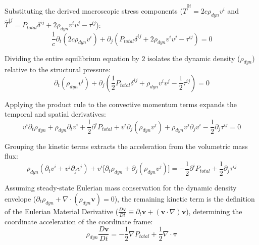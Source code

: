 Substituting the derived macroscopic stress components ($\hat{T}^{0i} = 2c\rho_{dyn}v^i$ and $\hat{T}^{ij} = P_{total} \delta^{ij} + 2\rho_{dyn} v^i v^j - \tau^{ij}$): 
\begin{equation}
    \frac{1}{c}\partial_t (2c \rho_{dyn} v^i) + \partial_j (P_{total} \delta^{ij} + 2\rho_{dyn} v^i v^j - \tau^{ij}) = 0
\end{equation}

Dividing the entire equilibrium equation by $2$ isolates the dynamic density ($\rho_{dyn}$) relative to the structural pressure: 
\begin{equation}
    \partial_t (\rho_{dyn} v^i) + \partial_j \left( \frac{1}{2} P_{total} \delta^{ij} + \rho_{dyn} v^i v^j - \frac{1}{2}\tau^{ij} \right) = 0 
\end{equation}

Applying the product rule to the convective momentum terms expands the temporal and spatial derivatives: 
\begin{equation}
    v^i \partial_t \rho_{dyn} + \rho_{dyn} \partial_t v^i + \frac{1}{2} \partial^i P_{total} + v^i \partial_j (\rho_{dyn} v^j) + \rho_{dyn} v^j \partial_j v^i - \frac{1}{2}\partial_j \tau^{ij} = 0 
\end{equation}

Grouping the kinetic terms extracts the acceleration from the volumetric mass flux: 
\begin{equation}
    \rho_{dyn} (\partial_t v^i + v^j \partial_j v^i) + v^i \big[ \partial_t \rho_{dyn} + \partial_j (\rho_{dyn} v^j) \big] = -\frac{1}{2}\partial^i P_{total} + \frac{1}{2}\partial_j \tau^{ij} 
\end{equation}

Assuming steady-state Eulerian mass conservation for the dynamic density envelope ($\partial_t \rho_{dyn} + \nabla \cdot (\rho_{dyn} \mathbf{v}) = 0$), the remaining kinetic term is the definition of the Eulerian Material Derivative ($\frac{D\mathbf{v}}{Dt} \equiv \partial_t \mathbf{v} + (\mathbf{v} \cdot \nabla)\mathbf{v}$), determining the coordinate acceleration of the coordinate frame: 
\begin{equation}
    \rho_{dyn} \frac{D\mathbf{v}}{Dt} = -\frac{1}{2}\nabla P_{total} + \frac{1}{2}\nabla \cdot \boldsymbol{\tau} \label{eq:cauchy_momentum} 
\end{equation}

